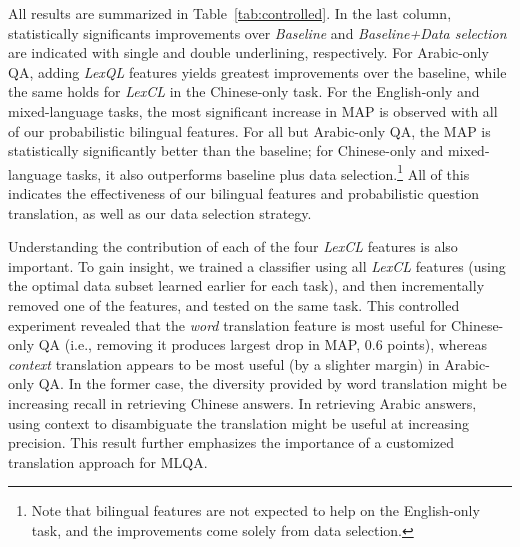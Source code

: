 \documentclass{sig-alternate-05-2015}
\begin{document}
All results are summarized in Table~\ref{tab:controlled}. In the last column, statistically
significants improvements over {\em Baseline} and {\em Baseline+Data selection} are indicated with single 
and double underlining, respectively. 
For Arabic-only QA, adding \emph{LexQL} features yields greatest improvements over the baseline, 
while the same holds for \emph{LexCL} in the Chinese-only task.
For the English-only and mixed-language tasks, the most significant increase in MAP is observed 
with all of our probabilistic bilingual features. For all but Arabic-only QA, the MAP is statistically significantly 
better than the baseline; for Chinese-only and mixed-language tasks, it also outperforms baseline 
plus data selection.\footnote{Note that bilingual features are not expected to help on the 
English-only task, and the improvements come solely from data selection.}
All of this indicates the effectiveness of our bilingual features and probabilistic question translation, 
as well as our data selection strategy.


Understanding the contribution of each of the four \emph{LexCL} features is also important. To gain insight, we 
trained a classifier using all {\em LexCL} features (using the optimal data subset learned earlier for each task), and then 
incrementally removed one of the features, and tested on the same task. 
This controlled experiment revealed that the \emph{word} translation feature is most useful for Chinese-only 
QA (i.e., removing it produces largest drop in MAP, 0.6 points), whereas \emph{context} translation appears 
to be most useful (by a slighter margin) in Arabic-only QA. In the former case, the diversity provided by
word translation might be increasing recall in retrieving Chinese answers. In retrieving Arabic
answers, using context to disambiguate the translation might be useful at increasing precision. This result
further emphasizes the importance of a customized translation approach for MLQA.
\end{document}
